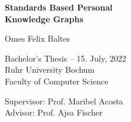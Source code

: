 \begin{titlepage}
    \begin{center}
        \vspace*{1cm}
        \Huge
        \textbf{Standards Based Personal\\ Knowledge Graphs}\\
        
        \vspace*{1cm}
        
        \Large
        Omes Felix Baltes
      
        \vfill
        
        \large
        Bachelor's Thesis -- 15. July, 2022\\
        Ruhr University Bochum\\
        Faculty of Computer Science\\
        
        \vspace{1cm}
        
        
        Supervisor: Prof. Maribel Acosta\\
        Advisor: Prof. Ajsa Fischer\\
 
    \end{center}
\end{titlepage}